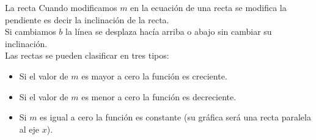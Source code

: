 \begin{infocard}{La recta}
    Cuando modificamos $m$ en la ecuación de una recta se modifica la pendiente es decir la inclinación de la recta.\\
    Si cambiamos $b$ la línea se desplaza hacía arriba o abajo sin cambiar su inclinación.\\

    Las rectas se pueden clasificar en tres tipos:
    \begin{itemize}
        \item Si el valor de $m$ es mayor a cero la función es creciente.
        \item Si el valor de $m$ es menor a cero la función es decreciente.
        \item Si $m$ es igual a cero la función es constante (su gráfica será una recta paralela al eje $x$).
    \end{itemize}
\end{infocard}